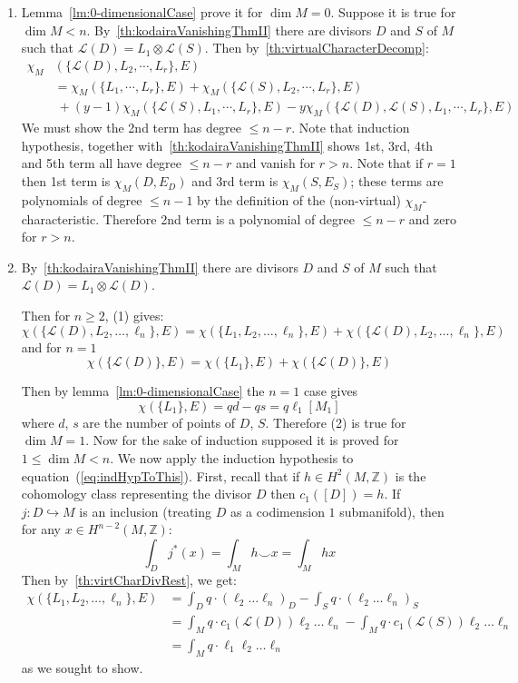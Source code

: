 \documentclass{ut-thesis}
\newenvironment{Proof}[1][]
  {\begin{ProofTcb}[#1]}
  {\end{ProofTcb}}
\newcommand{\Z}{{\mathbb{Z}}}
\newcommand{\CL}{{\mathcal{L}}}
\begin{document}
\begin{Proof}
\begin{enumerate}
  \item[1/2. ] Lemma~\cref{lm:0-dimensionalCase} prove it for $\dim M=0$. Suppose it is true for $\dim M<n$.
    By~\cref{th:kodairaVanishingThmII} there are divisors $D$ and $S$ of $M$ such that
    $\CL(D)=L_1\otimes\CL(S)$. Then by~\cref{th:virtualCharacterDecomp}:
    \begin{align*}
      \chi_M&(\{ \CL(D),L_2,\cdots,L_r \},E)\\
    &= \chi_M(\{ L_1,\cdots,L_r \},E) + \chi_M(\{ \CL(S),L_2,\cdots,L_r \},E) \\
                          &\ + (y-1)\chi_M(\{\CL(S),L_1,\cdots,L_r\},E)
                          - y\chi_M(\{\CL(D),\CL(S),L_1,\cdots,L_r\},E)
  \end{align*}
We must show the 2nd term has degree $\leq n-r$. Note that
induction hypothesis, together with~\cref{th:kodairaVanishingThmII} shows 1st, 3rd, 4th and 5th term all have
degree $\leq n-r$ and vanish for $r>n$. Note that if $r=1$ then 1st term is $\chi_M(D,E_D)$ and 3rd term is
$\chi_M(S,E_S)$; these terms are polynomials of degree $\leq n-1$ by the definition of the (non-virtual)
$\chi_M$-characteristic. Therefore 2nd term is a polynomial of degree $\leq n-r$ and zero for $r>n$.
\item[3. ] By~\cref{th:kodairaVanishingThmII} there are divisors $D$ and $S$ of $M$ such that
  $\CL(D)=L_1\otimes\CL(D)$.

Then for $n\ge 2$, (1) gives:
\[
    \chi(\{ \CL(D),L_2,\ldots,\ell_n \},E) = \chi(\{ L_1,L_2,\ldots,\ell_n \},E) + \chi(\{
    \CL(D),L_2,\ldots,\ell_n \},E)
\]
and for $n=1$
\begin{equation}\label{eq:indHypToThis}
    \chi(\{ \CL(D) \},E) = \chi(\{ L_1 \},E) + \chi(\{ \CL(D) \},E)
\end{equation}

Then by lemma~\cref{lm:0-dimensionalCase} the $n=1$ case gives
\[
    \chi(\{ L_1 \},E) = qd - qs = q\ell_1[M_1]
\]
where $d$, $s$ are the number of points of $D$, $S$. Therefore (2) is true for $\dim M=1$. Now for the sake of
induction supposed it is proved for $1\leq\dim M<n$. We now apply the induction hypothesis to
equation~(\ref{eq:indHypToThis}). First, recall that if $h \in H^2(M, \Z)$ is the cohomology class
representing the divisor $D$ then $c_1([D]) = h$. If $j: D \hookrightarrow M$ is an inclusion (treating $D$ as
a codimension $1$ submanifold), then for any $x \in H^{n-2}(M, \Z)$:
\[
  \int_D j^*(x) = \int_M h\smile x = \int_M hx
\]
Then by~\cref{th:virtCharDivRest}, we get:
\begin{align*}
    \chi(\{ L_1,L_2,\ldots,\ell_n \},E) &= \int_D q\cdot(\ell_2\ldots \ell_n)_D - \int_S q\cdot(\ell_2\ldots \ell_n)_S \\
    &= \int_M q\cdot c_1(\CL(D))\ell_2\ldots \ell_n - \int_Mq\cdot c_1(\CL(S))\ell_2\ldots \ell_n \\
    &= \int_M q\cdot \ell_1\ell_2\ldots \ell_n
\end{align*}
as we sought to show.
\end{enumerate}
\end{Proof}
\end{document}
